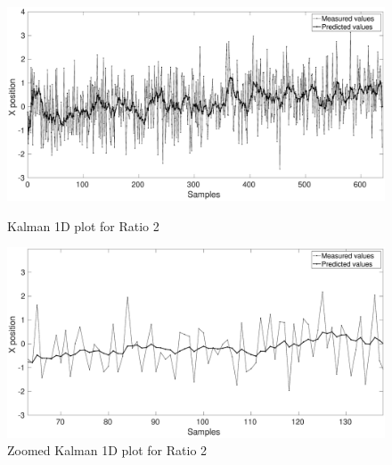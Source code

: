 \documentclass[12pt]{article}
\begin{document}
\begin{figure}[h]
\centering
\begin{minipage}{0.5\textwidth}
\centering
	\includegraphics[width = \textwidth]{./Figures/part1Ratio2.eps}
	\caption{Kalman 1D plot for Ratio 2}
	\label{fig:kalman 1D Rat2}
\end{minipage}%
\begin{minipage}{0.5\textwidth}
\centering
	\includegraphics[width = \textwidth]{./Figures/part1Ratio2zoomed.eps}
	\caption{ Zoomed Kalman 1D plot for Ratio 2}
	\label{fig: kalman 1D Rat2 zoom}
\end{minipage}
\end{figure}
\end{document}
